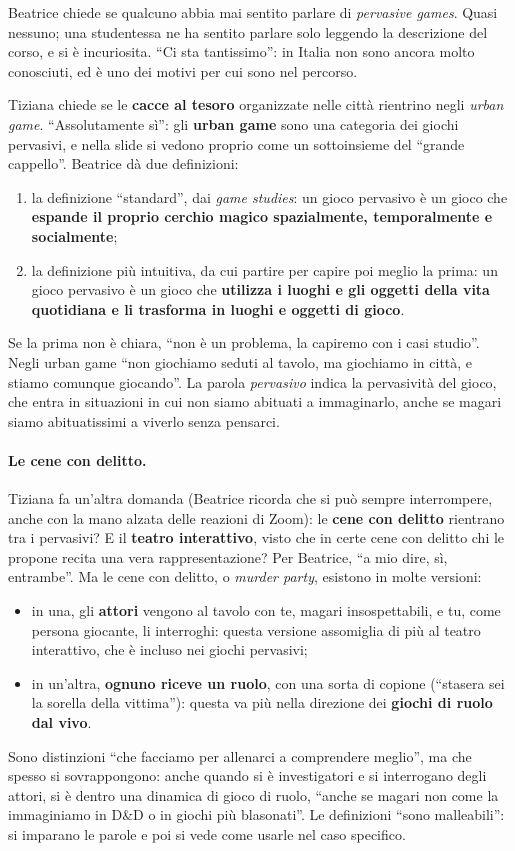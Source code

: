 Beatrice chiede se qualcuno abbia mai sentito parlare di \emph{pervasive games}.
Quasi nessuno; una studentessa ne ha sentito parlare solo leggendo la
descrizione del corso, e si è incuriosita. ``Ci sta tantissimo'': in Italia non
sono ancora molto conosciuti, ed è uno dei motivi per cui sono nel percorso.

Tiziana chiede se le \textbf{cacce al tesoro} organizzate nelle città rientrino
negli \emph{urban game}. ``Assolutamente sì'': gli \textbf{urban game} sono una
categoria dei giochi pervasivi, e nella slide si vedono proprio come un
sottoinsieme del ``grande cappello''. Beatrice dà due definizioni:
\begin{enumerate}
  \item la definizione ``standard'', dai \emph{game studies}: un gioco
        pervasivo è un gioco che \textbf{espande il proprio cerchio magico
        spazialmente, temporalmente e socialmente};
  \item la definizione più intuitiva, da cui partire per capire poi meglio la
        prima: un gioco pervasivo è un gioco che \textbf{utilizza i luoghi e gli
        oggetti della vita quotidiana e li trasforma in luoghi e oggetti di
        gioco}.
\end{enumerate}
Se la prima non è chiara, ``non è un problema, la capiremo con i casi studio''.
Negli urban game ``non giochiamo seduti al tavolo, ma giochiamo in città, e
stiamo comunque giocando''. La parola \emph{pervasivo} indica la pervasività del
gioco, che entra in situazioni in cui non siamo abituati a immaginarlo, anche se
magari siamo abituatissimi a viverlo senza pensarci.

\paragraph{Le cene con delitto.} Tiziana fa un'altra domanda (Beatrice ricorda
che si può sempre interrompere, anche con la mano alzata delle reazioni di
Zoom): le \textbf{cene con delitto} rientrano tra i pervasivi? E il
\textbf{teatro interattivo}, visto che in certe cene con delitto chi le propone
recita una vera rappresentazione? Per Beatrice, ``a mio dire, sì, entrambe''.
Ma le cene con delitto, o \emph{murder party}, esistono in molte versioni:
\begin{itemize}
  \item in una, gli \textbf{attori} vengono al tavolo con te, magari
        insospettabili, e tu, come persona giocante, li interroghi: questa
        versione assomiglia di più al teatro interattivo, che è incluso nei
        giochi pervasivi;
  \item in un'altra, \textbf{ognuno riceve un ruolo}, con una sorta di copione
        (``stasera sei la sorella della vittima''): questa va più nella
        direzione dei \textbf{giochi di ruolo dal vivo}.
\end{itemize}
Sono distinzioni ``che facciamo per allenarci a comprendere meglio'', ma che
spesso si sovrappongono: anche quando si è investigatori e si interrogano degli
attori, si è dentro una dinamica di gioco di ruolo, ``anche se magari non come
la immaginiamo in D\&D o in giochi più blasonati''. Le definizioni ``sono
malleabili'': si imparano le parole e poi si vede come usarle nel caso
specifico.

